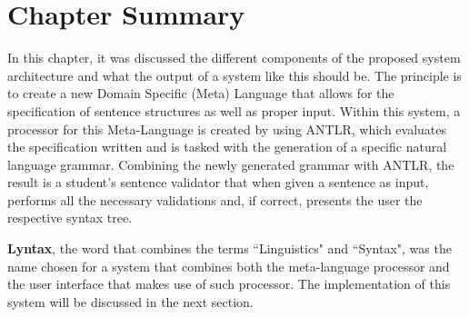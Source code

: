 \section{Chapter Summary}

In this chapter, it was discussed the different components of the proposed system architecture and what the output of a system like this should be.
The principle is to create a new Domain Specific (Meta) Language that allows for the specification of sentence structures as well as proper input.
Within this system, a processor for this Meta-Language is created by using \textsc{ANTLR},
which evaluates the specification written and is tasked with the generation of a specific natural language grammar.
Combining the newly generated grammar with \textsc{ANTLR}, the result is a student's sentence validator
that when given a sentence as input, performs all the necessary validations and, if correct, presents the user the respective syntax tree.

\textbf{Lyntax}, the word that combines the terms ``Linguistics" and ``Syntax", was the name chosen for a system that combines both the meta-language processor and
the user interface that makes use of such processor.
The implementation of this system will be discussed in the next section.
